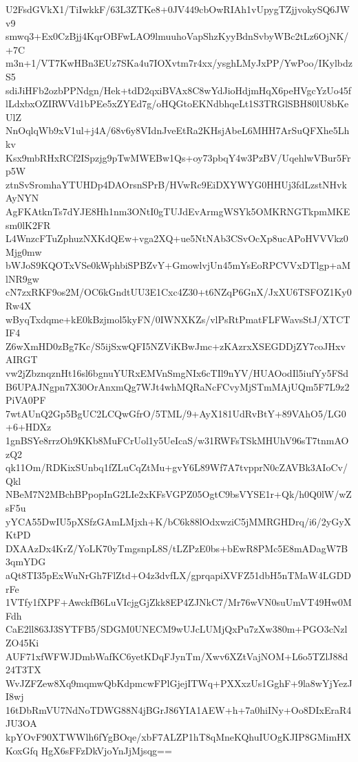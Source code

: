 U2FsdGVkX1/TiIwkkF/63L3ZTKe8+0JV449cbOwRIAh1vUpygTZjjvokySQ6JWv9
smwq3+Ex0CzBjj4KqrOBFwLAO9lmuuhoVapShzKyyBdnSvbyWBc2tLz6OjNK/+7C
m3n+1/VT7KwHBn3EUz7SKa4u7IOXvtm7r4xx/ysghLMyJxPP/YwPoo/IKylbdzS5
sdiJiHFb2ozbPPNdgn/Hek+tdD2qxiBVAx8C8wYdJioHdjmHqX6peHVgcYzUo45f
lLdxbxOZIRWVd1bPEe5xZYEd7g/oHQGtoEKNdbhqeLt1S3TRGlSBH80lU8bKeUlZ
NnOqlqWb9xV1ul+j4A/68v6y8VIdnJveEtRa2KHsjAbeL6MHH7ArSuQFXhe5Lhkv
Ksx9mbRHxRCf2ISpzjg9pTwMWEBw1Qs+oy73pbqY4w3PzBV/UqehlwVBur5Frp5W
ztnSvSromhaYTUHDp4DAOrsnSPrB/HVwRc9EiDXYWYG0HHUj3fdLzstNHvkAyNYN
AgFKAtknTs7dYJE8Hh1nm3ONtI0gTUJdEvArmgWSYk5OMKRNGTkpmMKEsm0lK2FR
L4WnzcFTuZphuzNXKdQEw+vga2XQ+ue5NtNAb3CSvOcXp8ucAPoHVVVkz0Mjg0mw
bWJoS9KQOTxVSe0kWphbiSPBZvY+GmowlvjUn45mYsEoRPCVVxDTlgp+aMlNR9gw
cN7zxRKF9os2M/OC6kGndtUU3E1Cxc4Z30+t6NZqP6GnX/JxXU6TSFOZ1Ky0Rw4X
wByqTxdqme+kE0kBzjmol5kyFN/0IWNXKZs/vlPsRtPmatFLFWavsStJ/XTCTIF4
Z6wXmHD0zBg7Kc/S5ijSxwQFI5NZViKBwJmc+zKAzrxXSEGDDjZY7coJHxvAIRGT
vw2jZbznqznHt16sl6bgnuYURxEMVnSmgNIx6cTIl9nYV/HUAOodIl5iufYy5FSd
B6UPAJNgpn7X30OrAnxmQg7WJt4whMQRaNcFCvyMjSTmMAjUQm5F7L9z2PiVA0PF
7wtAUnQ2Gp5BgUC2LCQwGfrO/5TML/9+AyX181UdRvBtY+89VAhO5/LG0+6+HDXz
1gnBSYe8rrzOh9KKb8MuFCrUol1y5UeIcaS/w31RWFsTSkMHUhV96sT7tnmAOzQ2
qk11Om/RDKixSUnbq1fZLuCqZtMu+gvY6L89Wf7A7tvpprN0cZAVBk3AIoCv/Qkl
NBeM7N2MBchBPpopInG2LIe2xKFsVGPZ05OgtC9bsVYSE1r+Qk/h0Q0lW/wZsF5u
yYCA55DwIU5pXSfzGAmLMjxh+K/bC6k88lOdxwziC5jMMRGHDrq/i6/2yGyXKtPD
DXAAzDx4KrZ/YoLK70yTmgsnpL8S/tLZPzE0bs+bEwR8PMc5E8mADagW7B3qmYDG
aQt8TI35pExWuNrGh7FlZtd+O4z3dvfLX/gprqapiXVFZ51dbH5nTMaW4LGDDrFe
1VTfy1fXPF+AwckfB6LuVIcjgGjZkk8EP4ZJNkC7/Mr76wVN0suUmVT49Hw0MFdh
CaE2ll863J3SYTFB5/SDGM0UNECM9wUJcLUMjQxPu7zXw380m+PGO3cNzlZO45Ki
AUF71xfWFWJDmbWafKC6yetKDqFJynTm/Xwv6XZtVajNOM+L6o5TZlJ88d24T3TX
WvJZFZew8Xq9mqmwQbKdpmcwFPlGjejITWq+PXXxzUs1GghF+9la8wYjYezJI8wj
16tDbRmVU7NdNoTDWG88N4jBGrJ86YIA1AEW+h+7a0hiINy+Oo8DIxEraR4JU3OA
kpYOvF90XTWWlh6fYgBOqe/xbF7ALZP1hT8qMneKQhuIUOgKJIP8GMimHXKoxGfq
HgX6sFFzDkVjoYnJjMjsqg==
